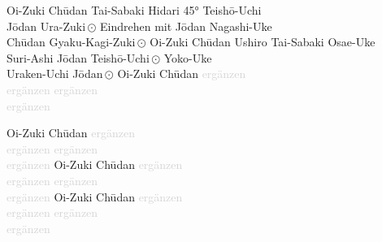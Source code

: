 \clearpage
\newpage
\begin{tcbitemize}[right=4pt,left=4pt,raster columns=3,raster equal height,colframe=GKD,colback=white,fonttitle=\bfseries]
	\tcbitem[squeezed title*={Kumite Ura 7}]
	Oi-Zuki Ch\={u}dan
	Tai-Sabaki Hidari 45° Teish\={o}-Uchi\\
	J\={o}dan Ura-Zuki\,\(\odot\)
	Eindrehen mit J\={o}dan Nagashi-Uke\\
	Ch\={u}dan Gyaku-Kagi-Zuki\,\(\odot\)
	\tcbitem[squeezed title*={Kumite Ura 8}]
	Oi-Zuki Ch\={u}dan
	Ushiro Tai-Sabaki Osae-Uke\\
	Suri-Ashi J\={o}dan Teish\={o}-Uchi\,\(\odot\)
	Yoko-Uke \\
	Uraken-Uchi J\={o}dan\,\(\odot\)
	\tcbitem[squeezed title*={Kumite Ura 9}]
	Oi-Zuki Ch\={u}dan
	\textcolor{lightgray}{ergänzen}\\
	\textcolor{lightgray}{ergänzen}
	\textcolor{lightgray}{ergänzen}\\
	\textcolor{lightgray}{ergänzen}
\end{tcbitemize}
\null\vfill\null
\zwitepf
\null\vfill\null
\begin{tcbitemize}[right=4pt,left=4pt,raster columns=3,raster equal height,colframe=GKD,colback=white,fonttitle=\bfseries]
	\tcbitem[squeezed title*={Kumite Ura 10}]
	Oi-Zuki Ch\={u}dan
	\textcolor{lightgray}{ergänzen}\\
	\textcolor{lightgray}{ergänzen}
	\textcolor{lightgray}{ergänzen}\\
	\textcolor{lightgray}{ergänzen}
	\tcbitem[squeezed title*={Kumite Ura 11}]
	Oi-Zuki Ch\={u}dan
	\textcolor{lightgray}{ergänzen}\\
	\textcolor{lightgray}{ergänzen}
	\textcolor{lightgray}{ergänzen}\\
	\textcolor{lightgray}{ergänzen}
	\tcbitem[squeezed title*={Kumite Ura 12}]
	Oi-Zuki Ch\={u}dan
	\textcolor{lightgray}{ergänzen}\\
	\textcolor{lightgray}{ergänzen}
	\textcolor{lightgray}{ergänzen}\\
	\textcolor{lightgray}{ergänzen}
\end{tcbitemize}
\clearpage
\newpage